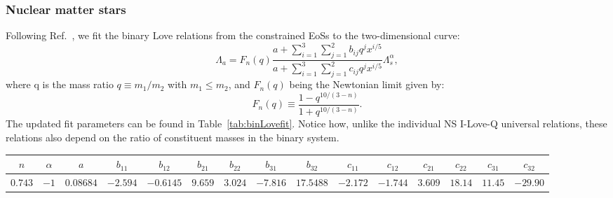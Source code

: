 \documentclass[prd,twocolumn,nofootinbib,superscriptaddress,amsmath,amssymb]{revtex4-1}
\begin{document}
\subsubsection{Nuclear matter stars}\label{sec:nuclear}
Following Ref.~\cite{Yagi:binLove}, we fit the binary Love relations from the constrained EoSs to the two-dimensional curve:
\begin{equation}\label{eq:binLovefit}
\Lambda_a=F_n(q) \frac{a+ \sum_{i=1}^3 \sum_{j=1}^2 b_{ij}q^j x^{i/5}}{a+ \sum_{i=1}^3 \sum_{j=1}^2 c_{ij}q^j x^{i/5}} \Lambda_s^{\alpha},
\end{equation}
where q is the mass ratio $q \equiv m_1/m_2$ with $m_1 \leq m_2$, and $F_n(q)$ being the Newtonian limit given by:
\begin{equation}
F_n(q) \equiv \frac{1-q^{10/(3-n)}}{1+q^{10/(3-n)}}.
\end{equation}
The updated fit parameters can be found in Table~\ref{tab:binLovefit}.
Notice how, unlike the individual NS I-Love-Q universal relations, these relations also depend on the ratio of constituent masses in the binary system.
\begin{table*}[ht!]
\centering
\caption{
Updated fit parameters for the binary Love universal relations, as given by the curve found in Eq.~\ref{eq:binLovefit}.
}\label{tab:binLovefit}
\addtolength{\tabcolsep}{1pt} 
\begin{tabular}{ c  c  c  c  c  c  c  c  c  c  c  c  c  c  c} 
 \hline
 \hline
 $n$ & $\alpha$ & $a$ & $b_{11}$ & $b_{12}$ & $b_{21}$ & $b_{22}$ & $b_{31}$ & $b_{32}$ & $c_{11}$ & $c_{12}$ & $c_{21}$ & $c_{22}$ & $c_{31}$ & $c_{32}$\\
 \hline
 $0.743$ & $-1$ & $0.08684$ & $-2.594$ & $-0.6145$ & $9.659$ & $3.024$ & $-7.816$ & $17.5488$ & $-2.172$ & $-1.744$ & $3.609$ & $18.14$ & $11.45$ & $-29.90$\\
\hline
 \hline
\end{tabular}
\addtolength{\tabcolsep}{-1pt}
\end{table*}
\end{document}
